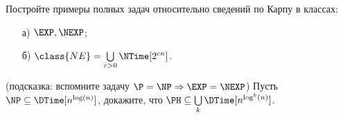 \begin{ptask}{20}
	Постройте примеры полных задач относительно сведений по Карпу в классах:
    \begin{enumerate}[topsep = 0pt, itemsep = -1ex]
        \item [а)] $\EXP, \NEXP$;
        \item [б)] $\class{NE} = \bigcup\limits_{c > 0} \NTime[2^{cn}]$.
	\end{enumerate}
\end{ptask}

\begin{ptask}{21}(подсказка: вспомните задачу $\P = \NP \Rightarrow \EXP = \NEXP$)
    Пусть $\NP \subseteq \DTime[n^{\log(n)}]$, докажите, что $\PH \subseteq \bigcup\limits_{k} \DTime[n^{\log^k(n)}]$.
\end{ptask}
